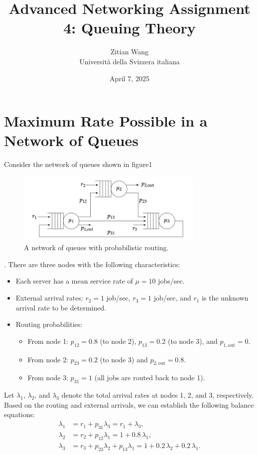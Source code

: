 \documentclass[12pt]{article}
\title{Advanced Networking Assignment 4: Queuing Theory}
\author{Zitian Wang \\ Università della Svizzera italiana}
\date{April 7, 2025}
\begin{document}
\maketitle

\section{Maximum Rate Possible in a Network of Queues}

Consider the network of queues shown in figure1
\begin{figure}[htbp]
    \centering
    \includegraphics[width=0.8\textwidth]{fig1.png}
    \caption{A network of queues with probabilistic routing.}
\end{figure}
. There are three nodes with the following characteristics:
\begin{itemize}
    \item Each server has a mean service rate of \(\mu = 10\) jobs/sec.
    \item External arrival rates: \(r_2 = 1\) job/sec, \(r_3 = 1\) job/sec, and \(r_1\) is the unknown arrival rate to be determined.
    \item Routing probabilities:
          \begin{itemize}
              \item From node 1: \(p_{12} = 0.8\) (to node 2), \(p_{13} = 0.2\) (to node 3), and \(p_{1,\mathrm{out}}=0\).
              \item From node 2: \(p_{23} = 0.2\) (to node 3) and \(p_{2,\mathrm{out}} = 0.8\).
              \item From node 3: \(p_{31} = 1\) (all jobs are routed back to node 1).
          \end{itemize}
\end{itemize}

Let \(\lambda_1\), \(\lambda_2\), and \(\lambda_3\) denote the total arrival rates at nodes 1, 2, and 3, respectively. Based on the routing and external arrivals, we can establish the following balance equations:
\begin{align}
    \lambda_1 &= r_1 + p_{31}\lambda_3 = r_1 + \lambda_3, \label{eq:node1}\\[1mm]
    \lambda_2 &= r_2 + p_{12}\lambda_1 = 1 + 0.8\,\lambda_1, \label{eq:node2}\\[1mm]
    \lambda_3 &= r_3 + p_{23}\lambda_2 + p_{13}\lambda_1 
               = 1 + 0.2\,\lambda_2 + 0.2\,\lambda_1. \label{eq:node3}
\end{align}
\end{document}
